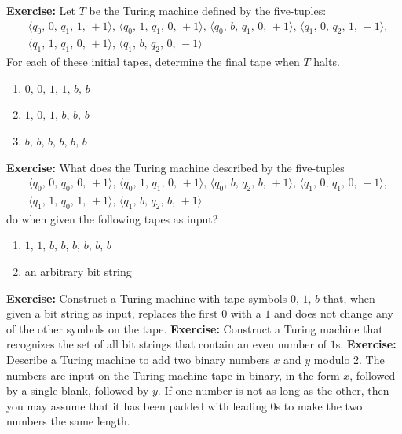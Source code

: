 \documentclass{beamer}
\begin{document}
\begin{frame}
\justify
\textbf{Exercise:} Let $T$ be the Turing machine defined by the five-tuples:
\begin{align*}
& \langle q_0,\,0,\,q_1,\,1,\,+1 \rangle,\, \langle q_0,\,1,\,q_1,\,0,\,+1 \rangle,\, \langle q_0,\,b,\,q_1,\,0,\,+1 \rangle,\, \langle q_1,\,0,\,q_2,\,1,\,-1 \rangle,\\ & \langle q_1,\,1,\,q_1,\,0,\,+1 \rangle,\, \langle q_1,\,b,\,q_2,\,0,\,-1 \rangle
\end{align*}
For each of these initial tapes, determine the final tape when $T$ halts.
\begin{enumerate}
\item $0,\,0,\,1,\,1,\,b,\,b$
\item $1,\,0,\,1,\,b,\,b,\,b$
\item $b,\,b,\,b,\,b,\,b,\,b$
\end{enumerate}
\vfill
\textbf{Exercise:} What does the Turing machine described by the five-tuples
\begin{align*}
& \langle q_0,\,0,\,q_0,\,0,\,+1 \rangle,\, \langle q_0,\,1,\,q_1,\,0,\,+1 \rangle,\, \langle q_0,\,b,\,q_2,\,b,\,+1 \rangle,\, \langle q_1,\,0,\,q_1,\,0,\,+1 \rangle,\\ & \langle q_1,\,1,\,q_0,\,1,\,+1 \rangle,\, \langle q_1,\,b,\,q_2,\,b,\,+1 \rangle
\end{align*}
do when given the following tapes as input?
\begin{enumerate}
\item $1,\,1,\,b,\,b,\,b,\,b,\,b,\,b$
\item an arbitrary bit string
\end{enumerate}
\end{frame}

\begin{frame}
\justify
\textbf{Exercise:} Construct a Turing machine with tape symbols $0,\,1,\,b$ that, when given a bit string as input, replaces the first $0$ with a $1$ and does not change any of the other symbols on the tape.
\vfill
\textbf{Exercise:} Construct a Turing machine that recognizes the set of all bit strings that contain an even number of $1$s.
\vfill
\textbf{Exercise:} Describe a Turing machine to add two binary numbers $x$ and $y$ modulo 2. The numbers are input on the Turing machine tape in binary, in the form $x$, followed by a single blank, followed by $y$. If one number is not as long as the other, then you may assume that it has been padded with leading 0s to make the two numbers the same length.
\end{frame}
\end{document}
